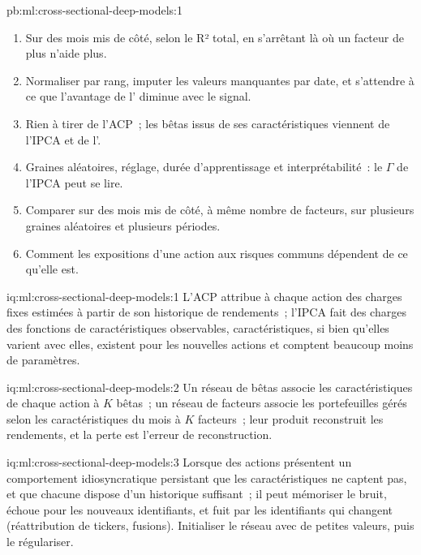 \begin{solution}{pb:ml:cross-sectional-deep-models:1}
\begin{enumerate}
caractéristiques courantes.
\item Sur des mois mis de côté, selon le R² total, en s'arrêtant là où un facteur de plus n'aide plus.
\item Normaliser par rang, imputer les valeurs manquantes par date, et s'attendre à ce que l'avantage de l' diminue avec le signal.
\item Rien à tirer de l'ACP~; les bêtas issus de ses caractéristiques viennent de l'IPCA et de l'.
\item Graines aléatoires, réglage, durée d'apprentissage et interprétabilité~: le $\Gamma$ de l'IPCA peut se lire.
\item Comparer sur des mois mis de côté, à même nombre de facteurs, sur plusieurs graines aléatoires et plusieurs périodes.
\item Comment les expositions d'une action aux risques communs dépendent de ce qu'elle est.
\end{enumerate}
\end{solution}

\begin{solution}{iq:ml:cross-sectional-deep-models:1}
L'ACP attribue à chaque action des charges fixes estimées à partir de son historique de rendements~; l'IPCA fait des charges des fonctions de caractéristiques observables,
caractéristiques, si bien qu'elles varient avec elles, existent pour les nouvelles actions et comptent beaucoup moins de paramètres.
\end{solution}

\begin{solution}{iq:ml:cross-sectional-deep-models:2}
Un réseau de bêtas associe les caractéristiques de chaque action à $K$ bêtas~; un réseau de facteurs associe les portefeuilles gérés selon les caractéristiques du
mois à $K$ facteurs~; leur produit reconstruit les rendements, et la perte est l'erreur de reconstruction.
\end{solution}

\begin{solution}{iq:ml:cross-sectional-deep-models:3}
Lorsque des actions présentent un comportement idiosyncratique persistant que les caractéristiques ne captent pas, et que chacune dispose d'un historique suffisant~; il peut
mémoriser le bruit, échoue pour les nouveaux identifiants, et fuit par les identifiants qui changent (réattribution de tickers, fusions). Initialiser le
réseau avec de petites valeurs, puis le régulariser.
\end{solution}

